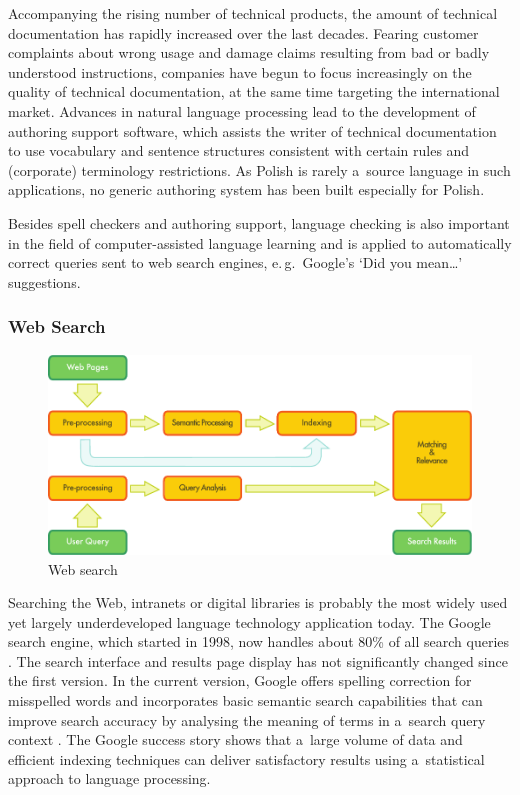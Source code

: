 \begin{multicols}{2}

Accompanying the rising number of technical products, the amount of
technical documentation has rapidly increased over the last decades.
Fearing customer complaints about wrong usage and damage claims
resulting from bad or badly understood instructions, companies have
begun to focus increasingly on the quality of technical documentation,
at the same time targeting the international market. Advances in
natural language processing lead to the development of authoring
support software, which assists the writer of technical documentation
to use vocabulary and sentence structures consistent with certain
rules and (corporate) terminology restrictions. As Polish is rarely
a~source language in such applications, no generic authoring system
has been built especially for Polish. 

Besides spell checkers and authoring support, language checking is
also important in the field of computer-assisted language learning and
is applied to automatically correct queries sent to web search
engines, e.\,g.~Google’s ‘Did you mean…’ suggestions. 

\subsubsection{Web Search} 

\begin{figure}[t]  \center
\includegraphics[width=\textwidth]{../_media/english/web_search_architecture}
\caption{Web search} \label{fig:websearcharch_en}
 \end{figure} 

Searching the Web, intranets or digital libraries is probably the most
widely used yet largely underdeveloped language technology application
today. The Google search engine, which started in 1998, now handles
about 80\% of all search queries \cite{spi1}. The search interface and
results page display has not significantly changed since the first
version. In the current version, Google offers spelling correction for
misspelled words and incorporates basic semantic search capabilities
that can improve search accuracy by analysing the meaning of terms in
a~search query context \cite{pc1}. The Google success story shows that
a~large volume of data and efficient indexing techniques can deliver
satisfactory results using a~statistical approach to language
processing. 


\end{multicols}

